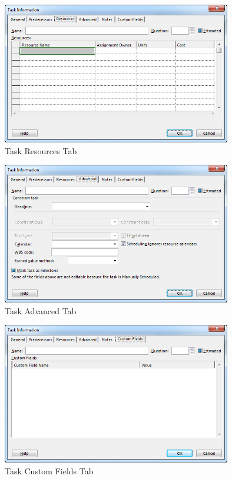 \begin{figure}
	\centering
		\includegraphics[width=10cm]{img/Resources.PNG}
	\caption{Task Resources Tab}
	\label{fig:Resources}
\end{figure}

\begin{figure}
	\centering
		\includegraphics[width=10cm]{img/Advanced.PNG}
	\caption{Task Advanced Tab}
	\label{fig:Advanced}
\end{figure}

\begin{figure}
	\centering
		\includegraphics[width=10cm]{img/Custom.PNG}
	\caption{Task Custom Fields Tab}
	\label{fig:Custom}
\end{figure}

